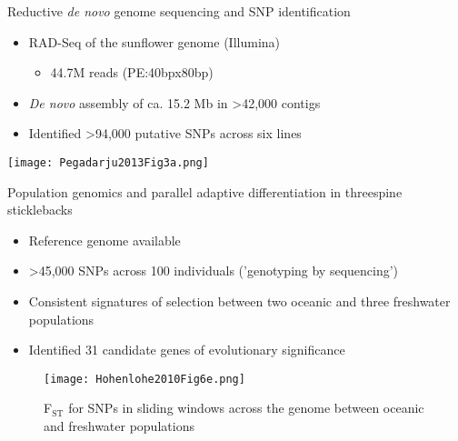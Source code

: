 \documentclass[presentation]{beamer}
\begin{document}
\begin{frame}[label={sec:orgff69a0e}]{Reductive \emph{de novo} genome sequencing and SNP identification}
\begin{itemize}
\item RAD-Seq of the sunflower genome (Illumina)
\begin{itemize}
\item 44.7M reads (PE:40bpx80bp)
\end{itemize}
\item \emph{De novo} assembly of ca. 15.2 Mb 
in >42,000 contigs
\item Identified >94,000 putative SNPs across six lines
\end{itemize}
\begin{latex}
\begin{center}
\end{latex}

\begin{center}
\texttt{[image: Pegadarju2013Fig3a.png]}
\end{center}


\end{frame}





\begin{frame}[label={sec:org53cbf38}]{Population genomics and parallel adaptive differentiation in threespine sticklebacks}
\begin{itemize}
\item Reference genome available
\item >45,000 SNPs across 100 individuals ('genotyping by sequencing')
\item Consistent signatures of selection between two oceanic and three
freshwater populations
\item Identified 31 candidate genes of evolutionary significance
\end{itemize}


\begin{figure}[htbp]
\centering
\texttt{[image: Hohenlohe2010Fig6e.png]}
\caption{F\(_{\text{ST}}\) for SNPs in sliding windows across the genome between oceanic and freshwater populations}
\end{figure}


\begin{latex}
\begin{center}
\tiny{\citep{Hohenlohe2010}}
\end{center}
\end{latex}
\end{frame}
\end{document}
